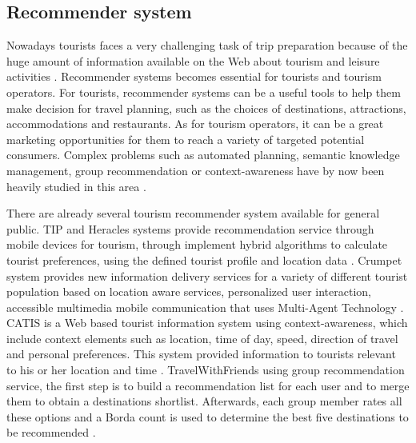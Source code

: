 \subsection{Recommender system}
Nowadays tourists faces a very challenging task of trip preparation because of the
huge amount of information available on the Web about tourism and leisure activities \cite{Adomavicius2015}.
Recommender systems becomes essential for tourists and tourism operators. For tourists,
recommender systems can be a useful tools to help them make decision for travel
planning, such as the choices of destinations, attractions, accommodations and
restaurants. As for tourism operators, it can be a great marketing opportunities for
them to reach a variety of targeted potential consumers. Complex problems such as
automated planning, semantic knowledge management, group recommendation or
context-awareness have by now been heavily studied in this area \cite{morenorecommender}. 

There are already several tourism recommender system available for general public. TIP
and Heracles systems provide recommendation service through mobile devices for tourism,
through implement hybrid algorithms to calculate tourist preferences, using the defined
tourist profile and location data \cite{morenorecommender}. Crumpet system provides new information 
delivery services for a variety of different tourist population based on location aware 
services, personalized user interaction, accessible multimedia mobile communication that
uses Multi-Agent Technology \cite{Santos2018}. CATIS is a Web based tourist information 
system using context-awareness, which include context elements such as location, 
time of day, speed, direction of travel and personal preferences. This system 
provided information to tourists relevant to his or her location and time \cite{Santos2018}. 
TravelWithFriends using group recommendation service, the first step is to build a 
recommendation list for each user and to merge them to obtain a destinations shortlist.
Afterwards, each group member rates all these options and a Borda count is used to 
determine the best five destinations to be recommended \cite{morenorecommender}.

